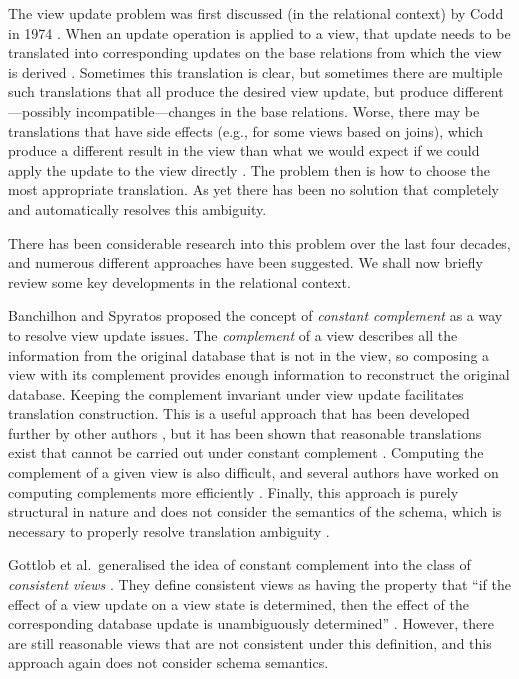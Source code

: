 \documentclass{sig-alternate-05-2015}
\begin{document}
\noindent The view update problem was first discussed (in the relational context) by Codd in 1974 \cite{Codd.E-1974a-Recent}. When an update operation is applied to a view, that update needs to be translated into corresponding updates on the base relations from which the view is derived \cite{Keller.A-1985a-Algorithms}. Sometimes this translation is clear, but sometimes there are multiple such translations that all produce the desired view update, but produce different---possibly incompatible---changes in the base relations. Worse, there may be translations that have side effects (e.g., for some views based on joins), which produce a different result in the view than what we would expect if we could apply the update to the view directly \cite{Keller.A-1985a-Algorithms}. The problem then is how to choose the most appropriate translation. As yet there has been no solution that completely and automatically resolves this ambiguity.

There has been considerable research into this problem over the last four decades, and numerous different approaches have been suggested. We shall now briefly review some key developments in the relational context.


Banchilhon and Spyratos proposed the concept of \emph{constant complement} \cite{Bancilhon.F-1981a-Update} as a way to resolve view update issues. The \emph{complement} of a view describes all the information from the original database that is not in the view, so composing a view with its complement provides enough information to reconstruct the original database. Keeping the complement invariant under view update facilitates translation construction. This is a useful approach that has been developed further by other authors \cite{Hegner.S-2004a-Order-based,Lechtenborger.J-2003a-Impact}, but it has been shown that reasonable translations exist that cannot be carried out under constant complement \cite{Keller.A-1987a-Comment}. Computing the complement of a given view is also difficult, and several authors have worked on computing complements more efficiently \cite{Cosmadakis.S-1984a-Updates,Laurent.D-2001a-Monotonic,Lechtenborger.J-2003a-Computation}. Finally, this approach is purely structural in nature and does not consider the semantics of the schema, which is necessary to properly resolve translation ambiguity \cite{Keller.A-1986a-Role}.

Gottlob et al.\ generalised the idea of constant complement into the class of \emph{consistent views} \cite{Gottlob.G-1988a-Properties}. They define consistent views as having the property that ``if the effect of a view update on a view state is determined, then the effect of the corresponding database update is unambiguously determined'' \cite{Gottlob.G-1988a-Properties}. However, there are still reasonable views that are not consistent under this definition, and this approach again does not consider schema semantics.
\end{document}
